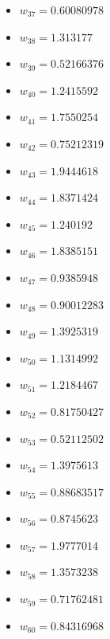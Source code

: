 \documentclass[11pt]{article}
\begin{document}
\begin{itemize}
\item $w_{37} = 0.60080978$
\item $w_{38} = 1.313177$
\item $w_{39} = 0.52166376$
\item $w_{40} = 1.2415592$
\item $w_{41} = 1.7550254$
\item $w_{42} = 0.75212319$
\item $w_{43} = 1.9444618$
\item $w_{44} = 1.8371424$
\item $w_{45} = 1.240192$
\item $w_{46} = 1.8385151$
\item $w_{47} = 0.9385948$
\item $w_{48} = 0.90012283$
\item $w_{49} = 1.3925319$
\item $w_{50} = 1.1314992$
\item $w_{51} = 1.2184467$
\item $w_{52} = 0.81750427$
\item $w_{53} = 0.52112502$
\item $w_{54} = 1.3975613$
\item $w_{55} = 0.88683517$
\item $w_{56} = 0.8745623$
\item $w_{57} = 1.9777014$
\item $w_{58} = 1.3573238$
\item $w_{59} = 0.71762481$
\item $w_{60} = 0.84316968$
\end{itemize}
\end{document}
